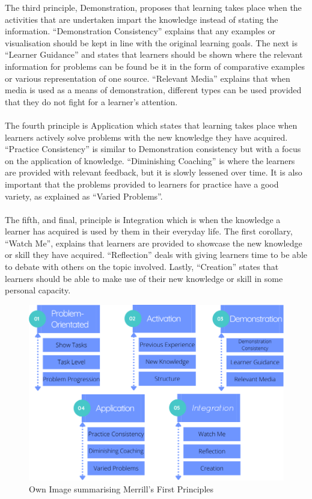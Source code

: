 \documentclass[conference]{IEEEtran}
\begin{document}
The third principle, Demonstration, proposes that learning takes place when the activities that are undertaken impart the knowledge instead of stating the information\cite{Merrill2002}. “Demonstration Consistency” explains that any examples or visualisation should be kept in line with the original learning goals\cite{Merrill2002}. The next is “Learner Guidance” and states that learners should be shown where the relevant information for problems can be found be it in the form of comparative examples or various representation of one source\cite{Merrill2002}. “Relevant Media” explains that when media is used as a means of demonstration, different types can be used provided that they do not fight for a learner’s attention\cite{Merrill2002}.
\\\\
The fourth principle is Application which states that learning takes place when learners actively solve problems with the new knowledge they have acquired\cite{Merrill2002}. “Practice Consistency” is similar to Demonstration consistency but with a focus on the application of knowledge\cite{Merrill2002}. “Diminishing Coaching” is where the learners are provided with relevant feedback, but it is slowly lessened over time\cite{Merrill2002}. It is also important that the problems provided to learners for practice have a good variety, as explained as “Varied Problems”\cite{Merrill2002}.
\\\\
The fifth, and final, principle is Integration which is when the knowledge a learner has acquired is used by them in their everyday life\cite{Merrill2002}. The first corollary, “Watch Me”, explains that learners are provided to showcase the new knowledge or skill they have acquired\cite{Merrill2002}. “Reflection” deals with giving learners time to be able to debate with others on the topic involved\cite{Merrill2002}. Lastly, “Creation” states that learners should be able to make use of their new knowledge or skill in some personal capacity\cite{Merrill2002}.
\\
\begin{figure}[htbp]
\centerline{\includegraphics[scale=0.35]{merrill2.png}}
\caption{Own Image summarising Merrill's First Principles}
\label{fig}
\end{figure}
\end{document}
